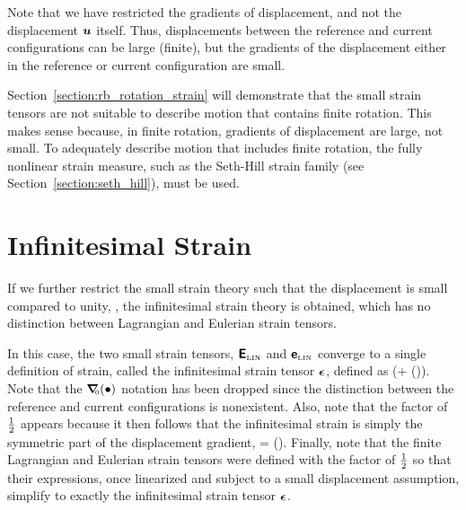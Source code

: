 Note that we have restricted the gradients of displacement, and not the
displacement $\mbox{\boldmath $u$}$ itself.  Thus, displacements between the reference and
current configurations can be large (finite), but the gradients of the
displacement either in the reference or current configuration are small.

Section~\ref{section:rb_rotation_strain} will demonstrate that the 
small strain tensors are not suitable to describe motion that
contains finite rotation.  
This makes sense because, in finite rotation, gradients of displacement
are large, not small.  To adequately describe motion that includes 
finite rotation, the fully nonlinear strain measure, 
such as the Seth-Hill strain family 
(see Section~\ref{section:seth_hill}), must be used.

\section{Infinitesimal Strain}
If we further restrict the small strain theory such that the displacement
is small compared to unity, 
\be
\vu {},
\ee
the infinitesimal strain theory
is obtained, which has no distinction between Lagrangian and Eulerian 
strain tensors.  

In this case, the two small strain tensors, 
$\mbox{\sffamily\bfseries E}_{\tiny \mbox{LIN}}$
and 
$\mbox{\sffamily\bfseries e}_{\tiny \mbox{LIN}}$
converge to a single definition of strain, called the infinitesimal
strain tensor $\mbox{\boldmath $\epsilon$}$, defined as
\be
 \ve{\epsilon}  \dst\half(\grad \vu + (\grad \vu)\transpose).
 \label{eq:infinitesimal_strain}
\ee
Note that the $\mbox{\boldmath $\nabla$}_{\hspace{-1mm}\mbox{\tiny 0}}(\bullet)$ notation has been dropped since the
distinction between the reference and current configurations is 
nonexistent. Also, note that the factor of $\frac{1}{2}$ appears because
it then follows that the infinitesimal strain is simply the symmetric
part of the displacement gradient, 
\be
 \ve{\epsilon} = \mbox{\sym}(\grad \vu).
\ee
Finally, note that the finite Lagrangian and Eulerian strain tensors
were defined with the factor of $\frac{1}{2}$ so that their expressions, 
once linearized and subject to a small displacement assumption, simplify
to exactly the infinitesimal strain tensor $\mbox{\boldmath $\epsilon$}$.


